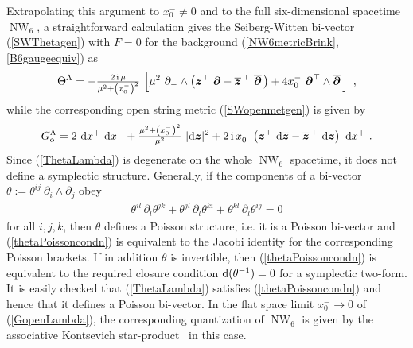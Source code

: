 \documentclass[11pt,a4paper]{article}
\DeclareMathOperator{\NW}{NW}
\newcommand{\ii}{{\rm i}}
\newcommand{\mbf}[1]{{\boldsymbol {#1} }}
\def\ii{{\,{\rm i}\,}}
\def\dd{{\rm d}}
\def\mz{{\mbf z}}
\def\mdell{{\mbf\partial}}
\newcommand{\beq}{\begin{eqnarray}}
\newcommand{\eeq}{\end{eqnarray}}
\begin{document}
Extrapolating this argument to $x_0^-\neq0$ and to the full
six-dimensional spacetime $\NW_6$, a straightforward calculation gives
the Seiberg-Witten bi-vector (\ref{SWThetagen}) with $F=0$ for the
background (\ref{NW6metricBrink},\ref{B6gaugeequiv}) as
\beq
\Theta^\Lambda=-\mbox{$\frac{2\ii\mu}{\mu^2+\left(x_0^-\right)^2}$}\,
\left[\mu^2~\partial_-\wedge\left(\mz^\top~\mdell-
\overline{\mz}{}^{\,\top}~\overline{\mdell}\,\right)+4x_0^-~
\mdell^\top\wedge\overline{\mdell}\,\right] \ ,
\label{ThetaLambda}\eeq
while the corresponding open string metric (\ref{SWopenmetgen}) is
given by
\beq
G_{\rm o}^\Lambda=2~\dd x^+~\dd x^-+\mbox{$\frac{\mu^2+\left(x_0^-
\right)^2}{\mu^2}$}~|\dd\mz|^2+2\ii x_0^-\,\left(\mz^\top~\dd
\overline{\mz}-\overline{\mz}{}^{\,\top}~\dd\mz\right)~\dd x^+ \ .
\label{GopenLambda}\eeq
Since (\ref{ThetaLambda}) is degenerate on the whole $\NW_6$
spacetime, it does not define a symplectic structure. Generally, if
the components of a bi-vector
$\theta:=\theta^{ij}~\partial_i\wedge\partial_j$ obey
\beq
\theta^{il}\,\partial_l\theta^{jk}+\theta^{jl}\,\partial_l\theta^{ki}+
\theta^{kl}\,\partial_l\theta^{ij}=0
\label{thetaPoissoncondn}\eeq
for all $i,j,k$, then $\theta$ defines a Poisson structure, i.e. it is
a Poisson bi-vector and (\ref{thetaPoissoncondn}) is equivalent to the Jacobi
identity for the corresponding Poisson brackets. If in addition
$\theta$ is invertible, then (\ref{thetaPoissoncondn}) is equivalent
to the required closure condition $\dd(\theta^{-1})=0$ for a
symplectic two-form. It is easily checked that (\ref{ThetaLambda})
satisfies (\ref{thetaPoissoncondn}) and hence that it defines a
Poisson bi-vector. In the flat space limit $x_0^-\to0$ of
(\ref{GopenLambda}), the corresponding quantization of $\NW_6$ is
given by the associative Kontsevich star-product~\cite{Kont1} in this
case.
\end{document}
